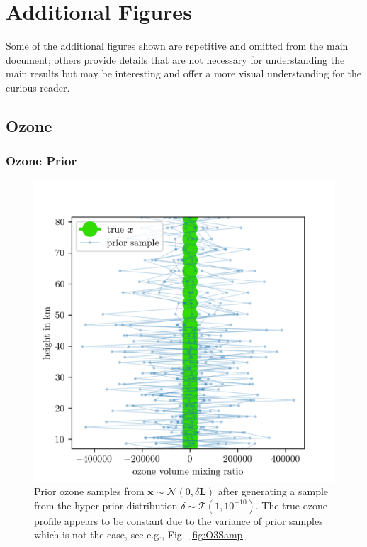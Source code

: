 \chapter{Additional Figures}
\label{ap:addFig}
\thispagestyle{empty}
Some of the additional figures shown are repetitive and omitted from the main document; others provide details that are not necessary for understanding the main results but may be interesting and offer a more visual understanding for the curious reader.
\clearpage
\section{Ozone}
\subsection{Ozone Prior}
\begin{figure}[ht!]
	\centering
	\includegraphics{OzonePrior.png}
	\caption[Samples from ozone prior distribution.]{Prior ozone samples from $\bm{x} \sim \mathcal{N}(0,\delta \bm{L})$ after generating a sample from the hyper-prior distribution $\delta \sim \mathcal{T}(1,10^{-10})$. The true ozone profile appears to be constant due to the variance of prior samples which is not the case, see e.g., Fig.~\ref{fig:O3Samp}.}
	\label{fig:O3Prior}
\end{figure}
\clearpage
